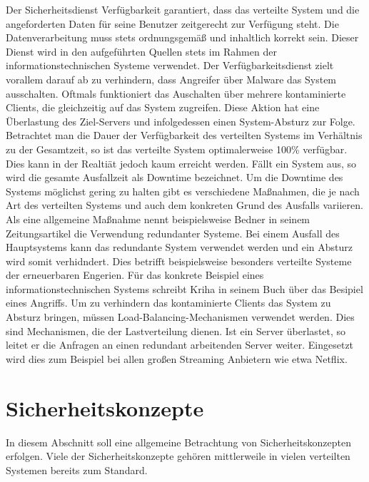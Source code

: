 \documentclass[utf8,biblatex]{lni}
\begin{document}
Der Sicherheitsdienst Verfügbarkeit garantiert, dass das verteilte System und die angeforderten Daten für seine Benutzer zeitgerecht zur Verfügung steht. Die Datenverarbeitung muss stets ordnungsgemäß
und inhaltlich korrekt sein. \citet{Bedner.2010}
Dieser Dienst wird in den aufgeführten Quellen stets im Rahmen der informationstechnischen Systeme verwendet. Der Verfügbarkeitsdienst
  zielt vorallem darauf ab zu verhindern, 
dass Angreifer über Malware das System ausschalten. Oftmals funktioniert das Auschalten über mehrere kontaminierte Clients, die gleichzeitig auf das System zugreifen. 
Diese Aktion hat eine Überlastung des Ziel-Servers und infolgedessen einen System-Absturz zur Folge. \citet{Kriha.2008}
\newline
Betrachtet man die Dauer der Verfügbarkeit des verteilten Systems im Verhältnis zu der Gesamtzeit, so ist das verteilte System optimalerweise 100\% verfügbar. Dies kann in der Realtiät jedoch kaum erreicht werden.
Fällt ein System aus, so wird die gesamte Ausfallzeit als Downtime bezeichnet. \citet{Bedner.2010}
\newline
 Um die Downtime des Systems möglichst gering zu halten gibt es verschiedene Maßnahmen, die je nach Art des verteilten Systems und auch
dem konkreten Grund des Ausfalls variieren. Als eine allgemeine Maßnahme nennt beispielsweise Bedner in seinem Zeitungsartikel \citet{Bedner.2010} die Verwendung redundanter Systeme. Bei einem Ausfall
des Hauptsystems kann das redundante System verwendet werden und ein Absturz wird somit verhidndert. Dies betrifft beispielsweise besonders verteilte Systeme der erneuerbaren Engerien.
Für das konkrete Beispiel eines informationstechnischen Systems schreibt Kriha in seinem Buch \citet{Kriha.2008} über das Besipiel eines Angriffs. Um zu verhindern das kontaminierte Clients das System zu Absturz
bringen, müssen Load-Balancing-Mechanismen verwendet werden. Dies sind Mechanismen, die der Lastverteilung dienen. Ist ein Server überlastet, so leitet er die Anfragen an einen redundant arbeitenden Server weiter.
Eingesetzt wird dies zum Beispiel bei allen großen Streaming Anbietern wie etwa Netflix.


\section{Sicherheitskonzepte}

In diesem Abschnitt soll eine allgemeine Betrachtung von Sicherheitskonzepten erfolgen. 
Viele der Sicherheitskonzepte gehören mittlerweile in vielen verteilten Systemen bereits zum Standard. 
\end{document}

